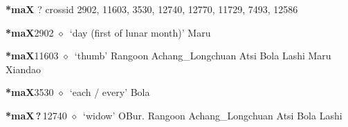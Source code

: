 \item
\textbf{*maX}
?
  {\tiny crossid 2902, 11603, 3530, 12740, 12770, 11729, 7493, 12586}
  \begin{list}{}{\leftmargin=1.5em \itemindent=-1.5em}
  \item {\footnotesize \textbf{*maX}}{\tiny 2902}
         $\diamond$~`day (first of lunar month)'
         Maru 
  \item {\footnotesize \textbf{*maX}}{\tiny 11603}
\hspace{1ex}
         $\diamond$~`thumb'
         Rangoon 
\hspace{1ex}
         Achang\_Longchuan 
\hspace{1ex}
         Atsi 
\hspace{1ex}
         Bola 
\hspace{1ex}
         Lashi 
\hspace{1ex}
         Maru 
\hspace{1ex}
         Xiandao 
  \item {\footnotesize \textbf{*maX}}{\tiny 3530}
\hspace{1ex}
         $\diamond$~`each / every'
         Bola 
  \item {\footnotesize \textbf{*maX\,?\,}}{\tiny 12740}
\hspace{1ex}
         $\diamond$~`widow'
         OBur. 
\hspace{1ex}
         Rangoon 
\hspace{1ex}
         Achang\_Longchuan 
\hspace{1ex}
         Atsi 
\hspace{1ex}
         Bola 
\hspace{1ex}
         Lashi 
\hspace{1ex}

\end{list}
